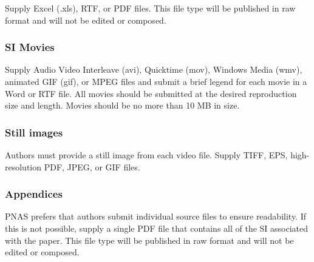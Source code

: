 \documentclass[9pt,twocolumn,twoside,]{pnas-new}
\begin{document}
Supply Excel (.xls), RTF, or PDF files. This file type will be published
in raw format and will not be edited or composed.

\hypertarget{si-movies}{%
\subsubsection*{SI Movies}\label{si-movies}}

Supply Audio Video Interleave (avi), Quicktime (mov), Windows Media
(wmv), animated GIF (gif), or MPEG files and submit a brief legend for
each movie in a Word or RTF file. All movies should be submitted at the
desired reproduction size and length. Movies should be no more than 10
MB in size.

\hypertarget{still-images}{%
\subsubsection*{Still images}\label{still-images}}

Authors must provide a still image from each video file. Supply TIFF,
EPS, high-resolution PDF, JPEG, or GIF files.

\hypertarget{appendices}{%
\subsubsection*{Appendices}\label{appendices}}

PNAS prefers that authors submit individual source files to ensure
readability. If this is not possible, supply a single PDF file that
contains all of the SI associated with the paper. This file type will be
published in raw format and will not be edited or composed.

\showmatmethods
\showacknow
\pnasbreak
\end{document}
